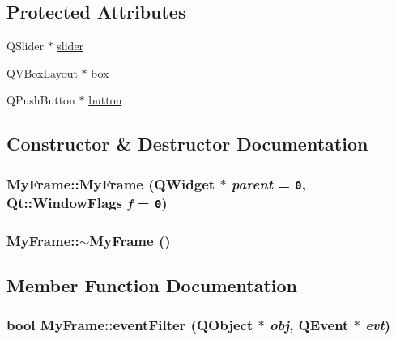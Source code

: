 \subsection*{Protected Attributes}
\begin{CompactItemize}
\item 
QSlider $\ast$ \hyperlink{class_my_frame_444e1de1ef9830b53a6dce407b388d37}{slider}
\item 
QVBoxLayout $\ast$ \hyperlink{class_my_frame_c0c0dbb5009083ec1f00b3595c54f490}{box}
\item 
QPushButton $\ast$ \hyperlink{class_my_frame_9e4e5884b8e72cb0e43de1cab71a55fe}{button}
\end{CompactItemize}


\subsection{Constructor \& Destructor Documentation}
\hypertarget{class_my_frame_79627212ce6e4b52f4a33e623d1a4ffd}{
\subsubsection[{MyFrame}]{\setlength{\rightskip}{0pt plus 5cm}MyFrame::MyFrame (QWidget $\ast$ {\em parent} = {\tt 0}, \/  Qt::WindowFlags {\em f} = {\tt 0})}}
\label{class_my_frame_79627212ce6e4b52f4a33e623d1a4ffd}


\hypertarget{class_my_frame_711b2bda77494841f2e582982b80c356}{
\subsubsection[{$\sim$MyFrame}]{\setlength{\rightskip}{0pt plus 5cm}MyFrame::$\sim$MyFrame ()}}
\label{class_my_frame_711b2bda77494841f2e582982b80c356}




\subsection{Member Function Documentation}
\hypertarget{class_my_frame_32e63ef366e315e0bafb66a5a14c3157}{
\subsubsection[{eventFilter}]{\setlength{\rightskip}{0pt plus 5cm}bool MyFrame::eventFilter (QObject $\ast$ {\em obj}, \/  QEvent $\ast$ {\em evt})}}
\label{class_my_frame_32e63ef366e315e0bafb66a5a14c3157}


